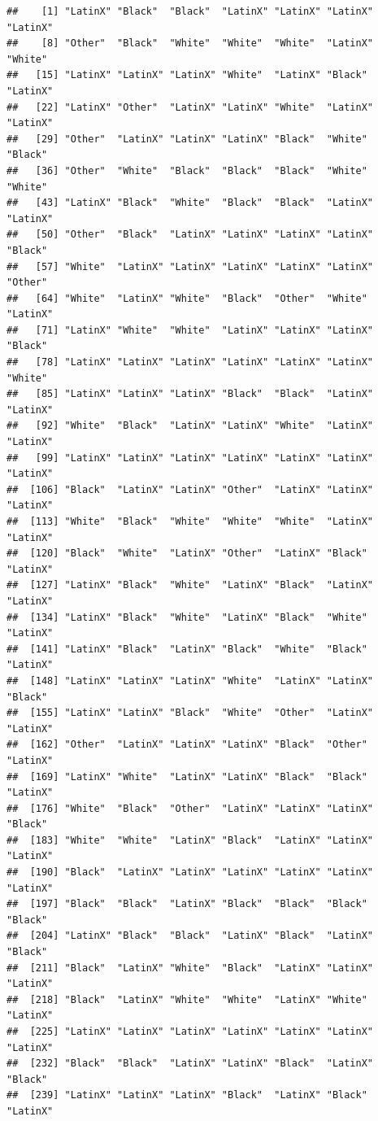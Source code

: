 \documentclass[]{book}
\begin{document}
\begin{verbatim}
##    [1] "LatinX" "Black"  "Black"  "LatinX" "LatinX" "LatinX" "LatinX"
##    [8] "Other"  "Black"  "White"  "White"  "White"  "LatinX" "White" 
##   [15] "LatinX" "LatinX" "LatinX" "White"  "LatinX" "Black"  "LatinX"
##   [22] "LatinX" "Other"  "LatinX" "LatinX" "White"  "LatinX" "LatinX"
##   [29] "Other"  "LatinX" "LatinX" "LatinX" "Black"  "White"  "Black" 
##   [36] "Other"  "White"  "Black"  "Black"  "Black"  "White"  "White" 
##   [43] "LatinX" "Black"  "White"  "Black"  "Black"  "LatinX" "LatinX"
##   [50] "Other"  "Black"  "LatinX" "LatinX" "LatinX" "LatinX" "Black" 
##   [57] "White"  "LatinX" "LatinX" "LatinX" "LatinX" "LatinX" "Other" 
##   [64] "White"  "LatinX" "White"  "Black"  "Other"  "White"  "LatinX"
##   [71] "LatinX" "White"  "White"  "LatinX" "LatinX" "LatinX" "Black" 
##   [78] "LatinX" "LatinX" "LatinX" "LatinX" "LatinX" "LatinX" "White" 
##   [85] "LatinX" "LatinX" "LatinX" "Black"  "Black"  "LatinX" "LatinX"
##   [92] "White"  "Black"  "LatinX" "LatinX" "White"  "LatinX" "LatinX"
##   [99] "LatinX" "LatinX" "LatinX" "LatinX" "LatinX" "LatinX" "LatinX"
##  [106] "Black"  "LatinX" "LatinX" "Other"  "LatinX" "LatinX" "LatinX"
##  [113] "White"  "Black"  "White"  "White"  "White"  "LatinX" "LatinX"
##  [120] "Black"  "White"  "LatinX" "Other"  "LatinX" "Black"  "LatinX"
##  [127] "LatinX" "Black"  "White"  "LatinX" "Black"  "LatinX" "LatinX"
##  [134] "LatinX" "Black"  "White"  "LatinX" "Black"  "White"  "LatinX"
##  [141] "LatinX" "Black"  "LatinX" "Black"  "White"  "Black"  "LatinX"
##  [148] "LatinX" "LatinX" "LatinX" "White"  "LatinX" "LatinX" "Black" 
##  [155] "LatinX" "LatinX" "Black"  "White"  "Other"  "LatinX" "LatinX"
##  [162] "Other"  "LatinX" "LatinX" "LatinX" "Black"  "Other"  "LatinX"
##  [169] "LatinX" "White"  "LatinX" "LatinX" "Black"  "Black"  "LatinX"
##  [176] "White"  "Black"  "Other"  "LatinX" "LatinX" "LatinX" "Black" 
##  [183] "White"  "White"  "LatinX" "Black"  "LatinX" "LatinX" "LatinX"
##  [190] "Black"  "LatinX" "LatinX" "LatinX" "LatinX" "LatinX" "LatinX"
##  [197] "Black"  "Black"  "LatinX" "Black"  "Black"  "Black"  "Black" 
##  [204] "LatinX" "Black"  "Black"  "LatinX" "Black"  "LatinX" "Black" 
##  [211] "Black"  "LatinX" "White"  "Black"  "LatinX" "LatinX" "LatinX"
##  [218] "Black"  "LatinX" "White"  "White"  "LatinX" "White"  "LatinX"
##  [225] "LatinX" "LatinX" "LatinX" "LatinX" "LatinX" "LatinX" "LatinX"
##  [232] "Black"  "Black"  "LatinX" "LatinX" "Black"  "LatinX" "Black" 
##  [239] "LatinX" "LatinX" "LatinX" "Black"  "LatinX" "Black"  "LatinX"

\end{verbatim}
\end{document}
